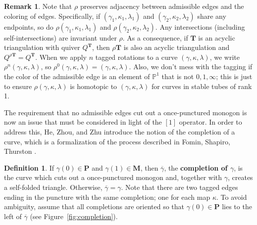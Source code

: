 \documentclass[11pt]{amsart}
\theoremstyle{plain}
\theoremstyle{definition}
\newtheorem{definition}[theorem]{Definition}
\newtheorem{remark}[theorem]{Remark}
\numberwithin{equation}{section}
\def\TT{\mathbf{T}}
\def\PP{\mathbf{P}}
\def\MM{\mathbf{M}}
\begin{document}
\begin{remark}
    Note that $\rho$ preserves adjacency between admissible edges and the coloring of edges.
    Specifically, if $(\gamma_1,\kappa_1,\lambda_1)$ and $(\gamma_2,\kappa_2,\lambda_2)$ share any endpoints, so do $\rho(\gamma_1,\kappa_1, \lambda_1)$ and $\rho(\gamma_2,\kappa_2, \lambda_2)$.
    Any intersections (including self-intersections) are invariant under $\rho$.
    As a consequence, if $\TT$ is an acyclic triangulation with quiver $Q^\TT$, then $\rho\TT$ is also an acyclic triangulation and $Q^{\rho\TT} = Q^\TT$.
    When we apply $n$ tagged rotations to a curve $(\gamma, \kappa, \lambda)$, we write $\rho^n(\gamma, \kappa, \lambda)$, so $\rho^0(\gamma, \kappa, \lambda) = (\gamma, \kappa, \lambda)$.
    Also, we don't mess with the tagging if the color of the admissible edge is an element of $\mathbb{P}^1$ that is not $0, 1, \infty$; this is just to ensure $\rho(\gamma, \kappa, \lambda)$ is homotopic to $(\gamma, \kappa, \lambda)$ for curves in stable tubes of rank 1.
\end{remark}

The requirement that no admissible edges cut out a once-punctured monogon is now an issue that must be considered in light of the $[1]$ operator.
In order to address this, He, Zhou, and Zhu \cite{he_geometric_2023} introduce the notion of the completion of a curve, which is a formalization of the process described in Fomin, Shapiro, Thurston \cite{fomin_cluster_2008}.

\begin{definition}\label{def-completion}
    If $\gamma(0) \in \PP$ and $\gamma(1) \in \MM$, then $\overline\gamma$, the \textbf{completion of $\gamma$}, is the curve which cuts out a once-punctured monogon and, together with $\gamma$, creates a self-folded triangle.
    Otherwise, $\overline\gamma = \gamma$.
    Note that there are two tagged edges ending in the puncture with the same completion; one for each map $\kappa$. 
    To avoid ambiguity, assume that all completions are oriented so that $\gamma(0) \in \PP$ lies to the left of $\overline\gamma$ (see Figure~\ref{fig:completion}).
\end{definition}
\end{document}
